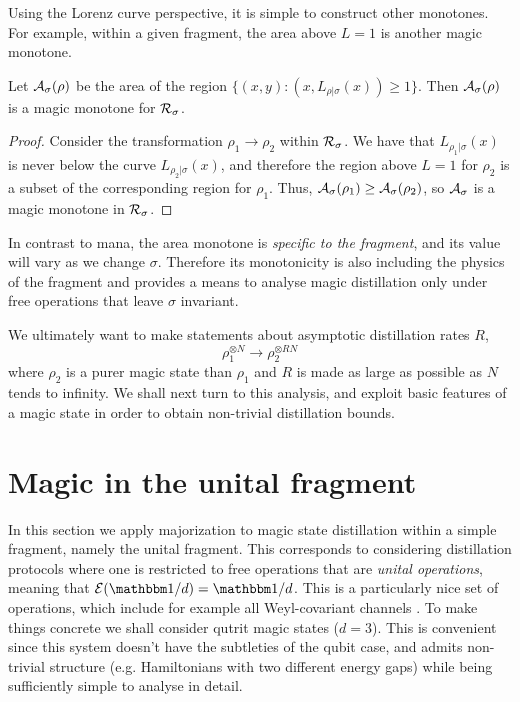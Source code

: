 \documentclass[pra,
aps,
twocolumn,
superscriptaddress,
groupedaddress,
nofootinbib,
reprint
]{revtex4-1}
\begin{document}
Using the Lorenz curve perspective, it is simple to construct other monotones. For example, within a given fragment, the area above $L=1$ is another magic monotone.
\begin{lemma} Let ${\mathcal A}_\sigma(\rho)$ be the area of the region $\{(x,y) : (x, L_{\rho | \sigma}(x)) \ge 1\}$. Then ${\mathcal A}_\sigma(\rho)$ is a magic monotone for $\mathcal{R}_\sigma$.
\end{lemma}
\begin{proof}
Consider the transformation $\rho_1 \rightarrow \rho_2$ within $\mathcal{R}_\sigma$. We have that $L_{\rho_1|\sigma}(x)$ is never below the curve $L_{\rho_2|\sigma}(x)$, and therefore the region above $L=1$ for $\rho_2$ is a subset of the corresponding region for $\rho_1$. Thus, ${\mathcal A}_\sigma(\rho_1) \geq {\mathcal A}_\sigma(\rho_2)$, so ${\mathcal A}_\sigma$ is a magic monotone in $\mathcal{R}_\sigma$.
\end{proof}
In contrast to mana, the area monotone is \emph{specific to the fragment}, and its value will vary as we change $\sigma$. Therefore its monotonicity is also including the physics of the fragment and provides a means to analyse magic distillation only under free operations that leave $\sigma$ invariant.

We ultimately want to make statements about asymptotic distillation rates $R$,
\begin{equation}
\rho_1^{\otimes N} \longrightarrow \rho_2^{\otimes R N}
\end{equation}
where $\rho_2$ is a purer magic state than $\rho_1$ and $R$ is made as large as possible as $N$ tends to infinity. We shall next turn to this analysis, and exploit basic features of a magic state in order to obtain non-trivial distillation bounds.


\section{Magic in the unital fragment}

In this section we apply majorization to magic state distillation within a simple fragment, namely the unital fragment. This corresponds to considering distillation protocols where one is restricted to free operations that are \emph{unital operations}, meaning that $\E(\I/d) = \I/d$. This is a particularly nice set of operations, which include for example all Weyl-covariant channels \ddd{[CITE]}. To make things concrete we shall consider qutrit magic states ($d=3$). This is convenient since this system doesn't have the subtleties of the qubit case, and admits non-trivial structure (e.g. Hamiltonians with two different energy gaps) while being sufficiently simple to analyse in detail.
\end{document}
